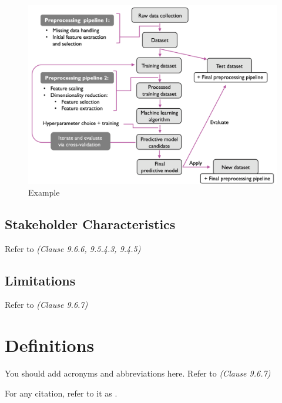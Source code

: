 \begin{figure}[ht]
\centering
\includegraphics[width=.9 \textwidth]{Figures/ExampleFigure.png}
\caption{Example \label{Fig:Example}}
\end{figure}


\subsection{Stakeholder Characteristics}

Refer to \textit{(Clause 9.6.6, 9.5.4.3, 9.4.5)}

\subsection{Limitations}

Refer to \textit{(Clause 9.6.7)}

\section{Definitions}

You should add acronyms and abbreviations here. Refer to \textit{(Clause 9.6.7)}



For any citation, refer to it as \cite{younis2021hybrid}.
